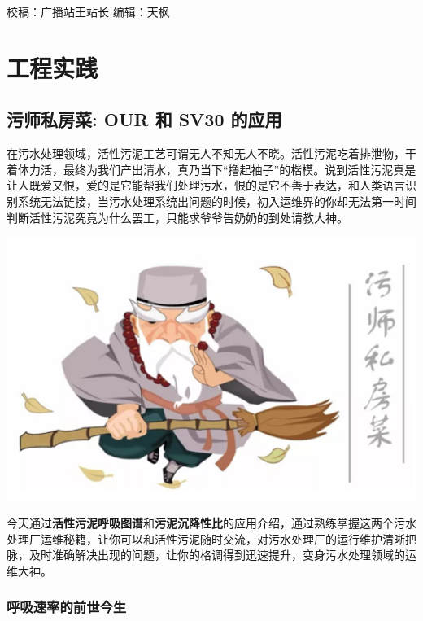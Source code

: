 \documentclass[]{book}
\begin{document}
校稿：广播站王站长
编辑：天枫

\hypertarget{eng}{%
\chapter{工程实践}\label{eng}}

\hypertarget{ux6c61ux5e08ux79c1ux623fux83dc-our-ux548c-sv30-ux7684ux5e94ux7528}{%
\section{污师私房菜: OUR 和 SV30 的应用}\label{ux6c61ux5e08ux79c1ux623fux83dc-our-ux548c-sv30-ux7684ux5e94ux7528}}

在污水处理领域，活性污泥工艺可谓无人不知无人不晓。活性污泥吃着排泄物，干着体力活，最终为我们产出清水，真乃当下``撸起袖子''的楷模。说到活性污泥真是让人既爱又恨，爱的是它能帮我们处理污水，恨的是它不善于表达，和人类语言识别系统无法链接，当污水处理系统出问题的时候，初入运维界的你却无法第一时间判断活性污泥究竟为什么罢工，只能求爷爷告奶奶的到处请教大神。

\includegraphics[width=6.67in]{images/os1}

今天通过\textbf{活性污泥呼吸图谱}和\textbf{污泥沉降性比}的应用介绍，通过熟练掌握这两个污水处理厂运维秘籍，让你可以和活性污泥随时交流，对污水处理厂的运行维护清晰把脉，及时准确解决出现的问题，让你的格调得到迅速提升，变身污水处理领域的运维大神。

\hypertarget{ux547cux5438ux901fux7387ux7684ux524dux4e16ux4ecaux751f}{%
\subsection{呼吸速率的前世今生}\label{ux547cux5438ux901fux7387ux7684ux524dux4e16ux4ecaux751f}}
\end{document}
